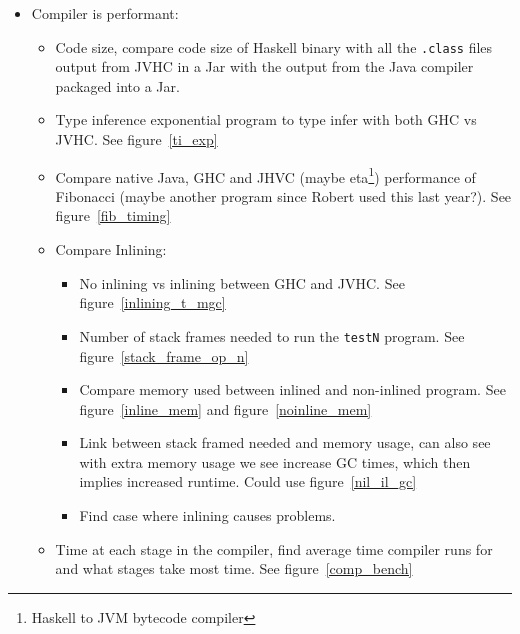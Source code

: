 \documentclass[a4paper]{article}
\begin{document}
\begin{itemize}
  \item Compiler is performant:
    \begin{itemize}
      \item Code size, compare code size of Haskell binary with
        all the \texttt{.class} files output from JVHC in a Jar with the output
        from the Java compiler packaged into a Jar.
      \item Type inference exponential program to type infer with both
        GHC vs JVHC. See figure~\ref{ti_exp}
      \item Compare native Java, GHC and JHVC (maybe 
        eta\footnote{Haskell to JVM bytecode compiler}) performance of 
        Fibonacci (maybe another program since Robert used this last year?).
        See figure~\ref{fib_timing}
      \item Compare Inlining:
        \begin{itemize}
          \item No inlining vs inlining between GHC and JVHC. 
            See figure~\ref{inlining_t_mgc}
          \item Number of stack frames needed to run the \texttt{testN} 
            program.
            See figure~\ref{stack_frame_op_n}
          \item Compare memory used between inlined and non-inlined program.
            See figure~\ref{inline_mem} and figure~\ref{noinline_mem}
          \item Link between stack framed needed and memory usage, can
            also see with extra memory usage we see increase
            GC times, which then implies increased runtime.
            Could use figure~\ref{nil_il_gc}
          \item Find case where inlining causes problems.
        \end{itemize}
      \item Time at each stage in the compiler, find average time 
        compiler runs for and what stages take most time. 
        See figure~\ref{comp_bench}
    \end{itemize}


\end{itemize}
\end{document}
